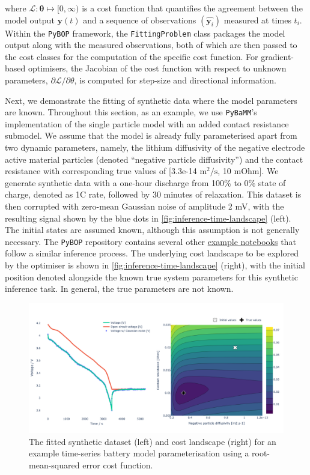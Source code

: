 \documentclass[
]{article}
\begin{document}
where \(\mathcal{L} : \mathbf{\theta} \mapsto [0,\infty)\) is a cost
function that quantifies the agreement between the model output
\(\mathbf{y}(t)\) and a sequence of observations
\((\hat{\mathbf{y}_i})\) measured at times \(t_i\). Within the
\texttt{PyBOP} framework, the \texttt{FittingProblem} class packages the
model output along with the measured observations, both of which are
then passed to the cost classes for the computation of the specific cost
function. For gradient-based optimisers, the Jacobian of the cost
function with respect to unknown parameters,
\(\partial \mathcal{L} / \partial \theta\), is computed for step-size
and directional information.

Next, we demonstrate the fitting of synthetic data where the model
parameters are known. Throughout this section, as an example, we use
\texttt{PyBaMM}'s implementation of the single particle model with an
added contact resistance submodel. We assume that the model is already
fully parameterised apart from two dynamic parameters, namely, the
lithium diffusivity of the negative electrode active material particles
(denoted ``negative particle diffusivity'') and the contact resistance
with corresponding true values of {[}3.3e-14 \(\text{m}^2/\text{s}\), 10
mOhm{]}. We generate synthetic data with a one-hour discharge from 100\%
to 0\% state of charge, denoted as 1C rate, followed by 30 minutes of
relaxation. This dataset is then corrupted with zero-mean Gaussian noise
of amplitude 2 mV, with the resulting signal shown by the blue dots in
\autoref{fig:inference-time-landscape} (left). The initial states are
assumed known, although this assumption is not generally necessary. The
\texttt{PyBOP} repository contains several other
\href{https://github.com/pybop-team/PyBOP/tree/develop/examples/notebooks}{example
notebooks} that follow a similar inference process. The underlying cost
landscape to be explored by the optimiser is shown in
\autoref{fig:inference-time-landscape} (right), with the initial
position denoted alongside the known true system parameters for this
synthetic inference task. In general, the true parameters are not known.

\begin{figure}
\centering
\includegraphics[width=1\textwidth,height=\textheight]{figures/joss/sim-landscape.png}
\caption{The fitted synthetic dataset (left) and cost landscape (right)
for an example time-series battery model parameterisation using a
root-mean-squared error cost function.
\label{fig:inference-time-landscape}}
\end{figure}
\end{document}
